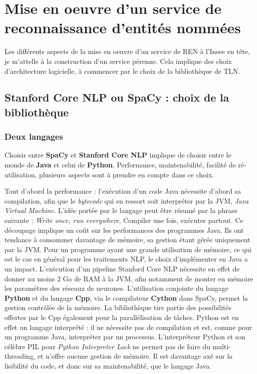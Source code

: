 \section{Mise en oeuvre d'un service de reconnaissance d'entités nommées}
Les différents aspects de la mise en oeuvre d'un service de REN à l'Insee en tête, je m'attelle à la construction d'un service pérenne. Cela implique des choix d'architecture logicielle, à commencer par le choix de la bibliothèque de TLN.

\subsection{Stanford Core NLP ou SpaCy : choix de la bibliothèque}

\subsubsection{Deux langages}
Choisir entre \textbf{SpaCy} et \textbf{Stanford Core NLP} implique de choisir entre le monde de \textbf{Java} et celui de \textbf{Python}. Performance, maintenabilité, facilité de ré-utilisation, plusieurs aspects sont à prendre en compte dans ce choix. 
\newline

Tout d'abord la performance : l'exécution d'un code Java nécessite d'abord sa compilation, afin que le \textit{bytecode} qui en ressort soit interpréter par la JVM, \textit{Java Virtual Machine}. L'idée portée par le langage peut être résumé par la phrase suivante : \textit{Write once, run everywhere}, Compiler une fois, exécuter partout. Ce découpage implique un coût sur les performances des programmes Java. Ils ont tendance à consommer davantage de mémoire, sa gestion étant gérée uniquement par la JVM. Pour un programme ayant une grande utilisation de mémoire, ce qui est le cas en général pour les traitements NLP, le choix d'implémenter en Java a un impact. L'exécution d'un pipeline Stanford Core NLP nécessite en effet de donner au moins 2 Go de RAM à la JVM, afin notamment de monter en mémoire les paramètres des réseaux de neurones. L'utilisation conjointe du langage \textbf{Python} et du langage \textbf{Cpp}, via le compilateur \textbf{Cython} dans SpaCy, permet la gestion contrôlée de la mémoire. La bibliothèque tire partie des possibilités offertes par le Cpp également pour la parallélisation de tâches. Python est en effet un langage interprété : il ne nécessite pas de compilation et est, comme pour un programme Java, interpréter par un processus. L'interpréteur Python et son célèbre PIL pour \textit{Python Interpreter Lock} ne permet pas de faire du multi-threading, et n'offre aucune gestion de mémoire. Il est davantage axé sur la lisibilité du code, et donc sur sa maintenabilité, que le langage Java.
\newline

